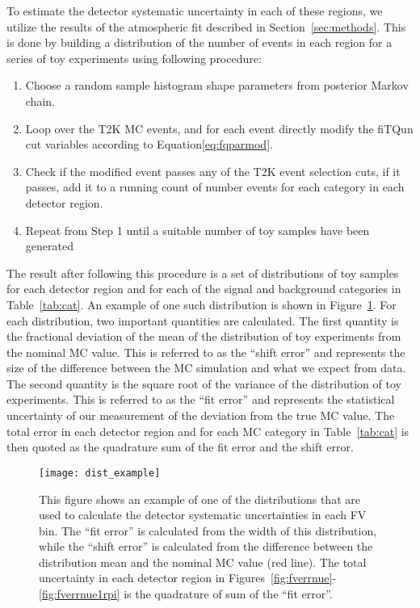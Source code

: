 To estimate the detector systematic uncertainty in each of these regions, we
utilize the results of the atmospheric fit described in
Section~\ref{sec:methods}. This is done by building a distribution of the
number of events in each region for a series of toy experiments using following
procedure:

\begin{enumerate}
  \item Choose a random sample histogram shape parameters from posterior Markov chain.
  \item Loop over the T2K MC events, and for each event directly modify the fiTQun cut variables
    according to Equation\ref{eq:fqparmod}.
  \item Check if the modified event passes any of the T2K event selection cuts,
    if it passes, add it to a running
    count of number events for each category in each detector region.
  \item Repeat from Step 1 until a suitable number of toy samples have been generated
\end{enumerate}

The result after following this procedure is a set of distributions of toy
samples for each detector region and for each of the signal and background
categories in Table~\ref{tab:cat}.  An example of one such distribution is
shown in Figure~\ref{fig:fverrsinglebin}.  For each distribution, two important
quantities are calculated.  The first quantity is the fractional deviation of
the mean of the distribution of toy experiments from the nominal MC value.
This is referred to as the ``shift error'' and represents the size of the
difference between the MC simulation and what we expect from data.  The second
quantity is the square root of the variance of the distribution of toy
experiments.  This is referred to as the ``fit error'' and represents the
statistical uncertainty of our measurement of the deviation from the true MC
value.  The total error in each detector region and for each MC category in
Table~\ref{tab:cat} is then quoted as the quadrature sum of the fit error and
the shift error. 

\begin{figure}[h]
  \begin{center}
    \texttt{[image: dist\_example]}
  \end{center}
  \caption{This figure shows an example of one of the distributions that are
  used to calculate the detector systematic uncertainties in each FV bin.  The
  ``fit error'' is calculated from the width of this distribution, while the
  ``shift error'' is calculated from the difference between the distribution
  mean and the nominal MC value (red line).  The total uncertainty in each
  detector region in Figures~\ref{fig:fverrnue}-\ref{fig:fverrnue1rpi} is the
  quadrature of sum of the ``fit error''.}
  \label{fig:fverrsinglebin}
\end{figure}

